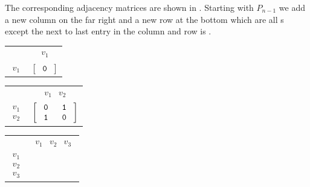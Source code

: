 \begin{exam}
\begin{actpart}
\begin{soln}
                The corresponding adjacency matrices are shown in .  Starting with $P_{n-1}$ we add a new column on the far right and a new row at the bottom which are all s except the next to last entry in the column and row is .

            \end{soln}
            \begin{table}[htbp]
                \centering
                \begin{tabular} {cc}
                    & $\begin{array} {c} v_1\end{array}$ \\ 
                    $\begin{array}{r} v_1\end{array}$  
                    & $\left[ \begin{array} {cccccc} 
                    ~\texttt{0}~  \\
                    \end{array} \right]$ \\
                \end{tabular}
                \hspace{.15in}
                \begin{tabular} {cc}
                    & $\begin{array} {cc} v_1&v_2 \end{array}$ \\ 
                    $\begin{array}{r} v_1 \\ v_2 \end{array}$  
                    & $\left[ \begin{array} {cccccc} 
                    ~\texttt{0}~ & ~\texttt{1}~  \\
                    \texttt{1} & \texttt{0}  \\
                    \end{array} \right]$ \\
                \end{tabular}
                \hspace{.15in}
                \begin{tabular} {cc}
                    & $\begin{array} {ccc} v_1&v_2&v_3 \end{array}$ \\ 
                    $\begin{array}{r} v_1 \\ v_2 \\ v_3 \end{array}$  

\end{tabular}
\end{table}
\end{actpart}
\end{exam}
